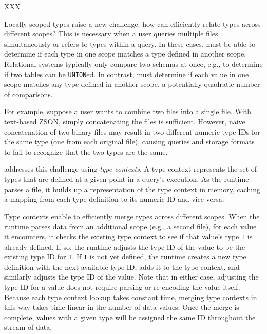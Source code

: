 XXX 

Locally scoped types raise a new challenge: how can \sys{} efficiently relate types across different scopes? This is necessary when a user queries multiple files simultaneously or refers to types within a query. In these cases, \sys{} must be able to determine if each type in one scope matches a type defined in another scope. Relational systems typically only compare two schemas at once, e.g., to determine if two tables can be \texttt{UNION}ed. In contrast, \sys{} must determine if each value in one scope matches any type defined in another scope, a potentially quadratic number of comparisons.

For example, suppose a user wants to combine two \sys{} files into a single file. With text-based ZSON, simply concatenating the files is sufficient. However, naive concatenation of two binary \sys{} files may result in two different numeric type IDs for the same type (one from each original file), causing queries and storage formats to fail to recognize that the two types are the same.

\sys{} addresses this challenge using {\em type contexts}. A type context represents the set of types that are defined at a given point in a query's execution. As the \sys{} runtime parses a file, it builds up a representation of the type context in memory, caching a mapping from each type definition to its numeric ID and vice versa.

Type contexts enable \sys{} to efficiently merge types across different scopes. When the runtime parses data from an additional scope (e.g., a second file), for each value it encounters, it checks the existing type context to see if that value's type \texttt{T} is already defined. If so, the runtime adjusts the type ID of the value to be the existing type ID for \texttt{T}. If \texttt{T} is not yet defined, the runtime creates a new type definition with the next available type ID, adds it to the type context, and similarly adjusts the type ID of the value. Note that in either case, adjusting the type ID for a value does not require parsing or re-encoding the value itself. Because each type context lookup takes constant time, merging type contexts in this way takes time linear in the number of data values. Once the merge is complete, values with a given type will be assigned the same ID throughout the stream of data.


